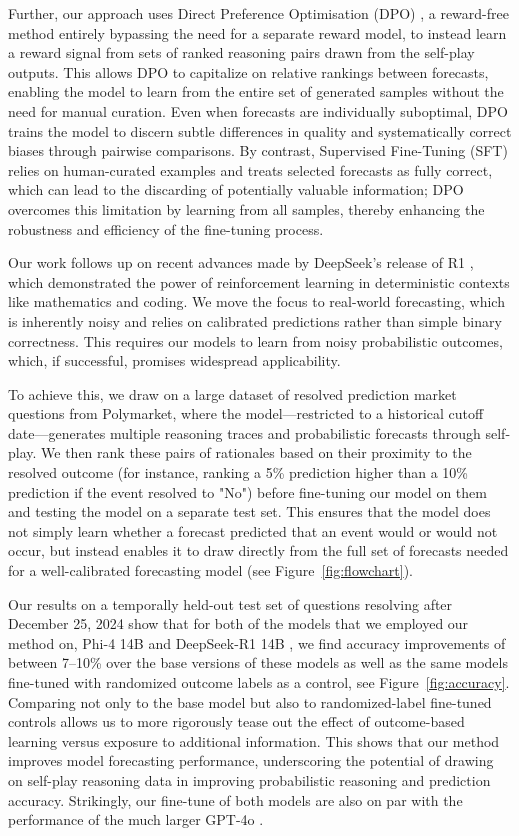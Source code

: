 \documentclass{article}
\begin{document}
Further, our approach uses Direct Preference Optimisation (DPO) \citep{Rafailov2024}, a reward-free method entirely bypassing the need for a separate reward model, to instead learn a reward signal from sets of ranked reasoning pairs \citep{Xu2024} drawn from the self-play outputs. This allows DPO to capitalize on relative rankings between forecasts, enabling the model to learn from the entire set of generated samples without the need for manual curation. Even when forecasts are individually suboptimal, DPO trains the model to discern subtle differences in quality and systematically correct biases through pairwise comparisons. By contrast, Supervised Fine-Tuning (SFT) relies on human-curated examples and treats selected forecasts as fully correct, which can lead to the discarding of potentially valuable information; DPO overcomes this limitation by learning from all samples, thereby enhancing the robustness and efficiency of the fine-tuning process.

Our work follows up on recent advances made by DeepSeek’s release of R1 \citep{Guo2025}, which demonstrated the power of reinforcement learning in deterministic contexts like mathematics and coding. We move the focus to real-world forecasting, which is inherently noisy and relies on calibrated predictions rather than simple binary correctness. This requires our models to learn from noisy probabilistic outcomes, which, if successful, promises widespread applicability.

To achieve this, we draw on a large dataset of resolved prediction market questions from Polymarket, where the model—restricted to a historical cutoff date—generates multiple reasoning traces and probabilistic forecasts through self-play. We then rank these pairs of rationales based on their proximity to the resolved outcome (for instance, ranking a 5\% prediction higher than a 10\% prediction if the event resolved to "No") before fine-tuning our model on them and testing the model on a separate test set. This ensures that the model does not simply learn whether a forecast predicted that an event would or would not occur, but instead enables it to draw directly from the full set of forecasts needed for a well-calibrated forecasting model (see Figure~\ref{fig:flowchart}).


Our results on a temporally held-out test set of questions resolving after December 25, 2024 show that for both of the models that we employed our method on, Phi-4 14B \citep{Abdin2024} and DeepSeek-R1 14B \citep{Guo2025}, we find accuracy improvements of between 7--10\% over the base versions of these models as well as the same models fine-tuned with randomized outcome labels as a control, see Figure~\ref{fig:accuracy}. Comparing not only to the base model but also to randomized-label fine-tuned controls allows us to more rigorously tease out the effect of outcome-based learning versus exposure to additional information. This shows that our method improves model forecasting performance, underscoring the potential of drawing on self-play reasoning data in improving probabilistic reasoning and prediction accuracy. Strikingly, our fine-tune of both models are also on par with the performance of the much larger GPT-4o \citep{Hurst2024}.
\end{document}
